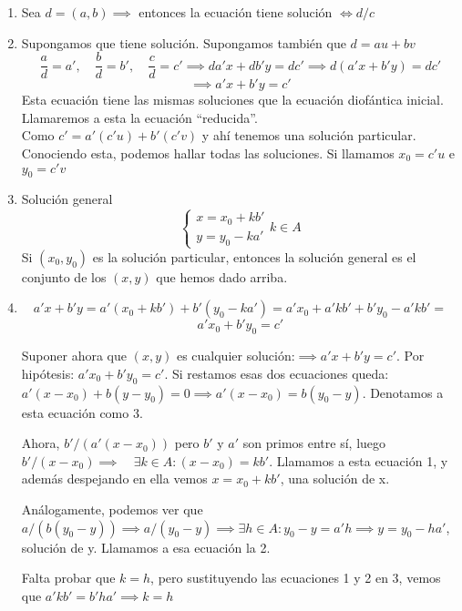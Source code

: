 \documentclass[11pt, a4paper, titlepage]{article}
\makeatletter
\newif\IfInSansMode
\let\oldsf\sffamily
\renewcommand*{\sffamily}{\oldsf\mathversion{sans}\InSansModetrue}
\let\oldnorm\normalfont
\renewcommand*{\normalfont}{\oldnorm\InSansModefalse\mathversion{normal}}
\renewenvironment{proof}[1][\proofname] {\vspace{-15pt}\par\pushQED{\qed}\normalfont\topsep6\p@\@plus6\p@\relax\trivlist\item[\hskip\labelsep\it#1\@addpunct{.}]\ignorespaces}{\popQED\endtrivlist\@endpefalse}
\renewenvironment{proof}[1][\proofname] {\par\pushQED{\qed}\normalfont\topsep6\p@\@plus6\p@\relax\trivlist\item[\hskip\labelsep\itshape\sffamily#1\@addpunct{.}]\ignorespaces}{\popQED\endtrivlist\@endpefalse}
\theoremstyle{theorem-style}
\theoremstyle{definition-style}
\theoremstyle{remark-style}
\theoremstyle{example-style}
\newenvironment{nlist}
{\begin{enumerate}
\renewcommand\labelenumi{(\emph{\roman{enumi})}}}
{\end{enumerate}}
\makeatother
\begin{document}
\begin{nlist}
	\item Sea $d=(a,b)\implies$ entonces la ecuación tiene solución $\iff d/c$
	\item Supongamos que tiene solución. Supongamos también que $d= au+bv$
\[
\frac{a}{d}= a',\quad \frac{b}{d}=b',\quad \frac{c}{d}=c'\implies da'x + db'y = dc' \implies d(a'x+b'y)=dc'\]
\[ \implies a'x+b'y = c'
\]
Esta ecuación tiene las mismas soluciones que la ecuación diofántica inicial. Llamaremos a esta la ecuación ``reducida''.\\


Como $c'= a'(c'u)+b'(c'v)$ y ahí tenemos una solución particular. Conociendo esta, podemos hallar todas las soluciones. Si llamamos $x_0 =c'u$ e $y_0 = c'v$

\item Solución general \[\begin{cases}
	x = x_0 +kb'\\
	y= y_0 -ka'
\end{cases} k\in A\]
Si $(x_0,y_0)$ es la solución particular, entonces la solución general es el conjunto de los $(x,y)$ que hemos dado arriba.
\\
\begin{proof}[Demostración de iii)]

\[
a'x + b'y = a'(x_0 +kb') + b'(y_0 - ka') = a'x_0 + a'kb' + b'y_0 - a'kb' =
\]
\[
a'x_0 +b'y_0 = c'
\]

Suponer ahora que $(x,y)$ es cualquier solución:$\implies a'x +b'y = c'$. Por hipótesis: $a'x_0 +b'y_0 = c'$. Si restamos esas dos ecuaciones queda: $a'(x-x_0) +b(y-y_0) = 0 \implies a'(x-x_0) = b(y_0-y)$. Denotamos a esta ecuación como 3.

Ahora, $b'/(a'(x-x_0))$ pero $b'$ y $a'$ son primos entre sí, luego $b'/(x-x_0)\implies \quad \exists k \in A : (x-x_0) = kb'$. Llamamos a esta ecuación 1, y además despejando en ella vemos $x = x_0 + kb'$, una solución de x.

Análogamente, podemos ver que $a/(b(y_0-y)) \implies a/(y_0-y) \implies \exists h \in A: y_0 -y = a'h \implies y = y_0 - ha'$, solución de y. Llamamos a esa ecuación la 2.

Falta probar que $k = h$, pero sustituyendo las ecuaciones 1 y 2 en 3, vemos que $a'kb'  = b'ha' \implies k = h$

\end{proof}

\end{nlist}
\end{document}
